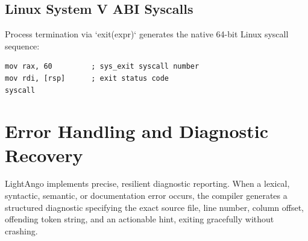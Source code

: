 \subsection{Linux System V ABI Syscalls}
Process termination via `exit(expr)` generates the native 64-bit Linux syscall sequence:
\begin{verbatim}
mov rax, 60         ; sys_exit syscall number
mov rdi, [rsp]      ; exit status code
syscall
\end{verbatim}

\section{Error Handling and Diagnostic Recovery}
LightAngo implements precise, resilient diagnostic reporting. When a lexical, syntactic, semantic, or documentation error occurs, the compiler generates a structured diagnostic specifying the exact source file, line number, column offset, offending token string, and an actionable hint, exiting gracefully without crashing.
\newpage
